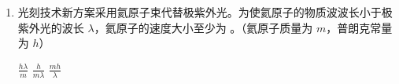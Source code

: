 \documentclass[\gkver]{gaokaozhenti}
\begin{document}
\begin{enumerate}
\begin{enumerate}
	\onepicture[align=right, h=4.41cm]{}

	\begin{enumerate}
		\item
		若电源输出电压为 $U$，电容器两极板间距为 $d$，则极板间电场的电场强度大小为 。

		\item
		设一锡液滴进入电容器时电势能为 $E_{p1}$，其所在位置电势为 $\varphi_{1}$；该液滴即将离开电容器时电势能为 $E_{p2}$，所在位置电势为 $\varphi_{2}$，则 。

		{$E_{p1} > E_{p2}$，$\varphi_{1} > \varphi_{2}$}
		{$E_{p1} < E_{p2}$，$\varphi_{1} < \varphi_{2}$}
		{$E_{p1} > E_{p2}$，$\varphi_{1} < \varphi_{2}$}

		\item
		若锡滴都落在 $b$ 点右侧，在不改变其他条件的情况下，为使锡液滴能落至 $b$ 点，可将 （多选）。

		{电阻 $R$ 的阻值调大}
		{电容器 $C$ 整体上移}
		{电容器 $C$ 整体下移}
		{电容器 $C$ 右极板向左移}
		{电容器 $C$ 右极板向右移}

		\item
		锡离子从高能级态向低能级态跃迁发出波长为 $\lambda$ 的极紫外光，则这两个能级的能量差为 。（普朗克常量为 $h$，真空中的光速为 $c$）
	\end{enumerate}

	\item
	光刻技术新方案采用氦原子束代替极紫外光。为使氦原子的物质波波长小于极紫外光的波长 $\lambda$，氦原子的速度大小至少为 。（氦原子质量为 $m$，普朗克常量为 $h$）

	{$\frac{h\lambda}{m}$}
	{$\frac{h}{m\lambda}$}
	{$\frac{mh}{\lambda}$}
\end{enumerate}
\end{enumerate}
\end{document}
